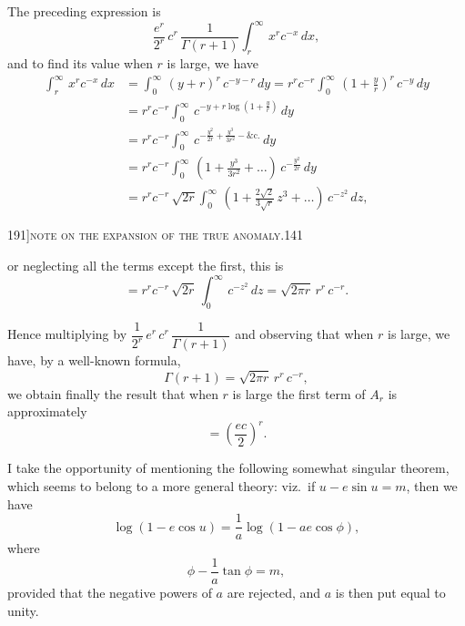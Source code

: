 \documentclass[11pt]{article}
\begin{document}
The preceding expression is
\[
\frac{e^{r}}{2^{r}}\,c^{r}\,\frac{1}{\Gamma(r+1)}\int_{r}^{\infty}\,x^{r} c^{-x}\,dx,
\]
and to find its value when $r$ is large, we have
\begin{align*}
\int_{r}^{\infty}\,x^{r} c^{-x}\,dx &= \int_{0}^{\infty}\,(y + r)^{r}\,c^{-y - r}\,dy = r^{r} c^{-r}\int_{0}^{\infty}\,\left(1 + \tfrac{y}{r}\right)^{r}\,c^{-y}\,dy \\
&= r^{r} c^{-r}\int_{0}^{\infty}\,c^{-y + r\log(1 + \frac{y}{r})}\,dy \\
&= r^{r} c^{-r}\int_{0}^{\infty}\,c^{-\frac{y^{2}}{2r} + \frac{y^{3}}{3r^{2}} - \&\text{c.}}\,dy \\
&= r^{r} c^{-r}\int_{0}^{\infty}\,\left(1 + \frac{y^{3}}{3r^{2}} + \ldots\right)\,c^{-\frac{y^{2}}{2r}}\,dy \\
&= r^{r} c^{-r}\,\sqrt{2 r}\int_{0}^{\infty}\,\left(1 + \frac{2\sqrt{2}}{3\sqrt{r}}\,z^{3} + \ldots\right)\,c^{-z^{2}}\,dz,
\end{align*}

\newpage

\begin{center}
\small 191]\hfill\textsc{note on the expansion of the true anomaly.}\hfill\textsc{141}
\end{center}

\medskip

\noindent or neglecting all the terms except the first, this is
\[
= r^{r} c^{-r}\,\sqrt{2 r}\,\int_{0}^{\infty}\,c^{-z^{2}}\,dz = \sqrt{2 \pi r}\,r^{r}\,c^{-r}.
\]

Hence multiplying by $\dfrac{1}{2^{r}}\,e^{r}\,c^{r}\,\dfrac{1}{\Gamma(r+1)}$ and observing that when $r$ is large, we have, by a well-known formula,
\[
\Gamma(r+1) = \sqrt{2 \pi r}\,r^{r}\,c^{-r},
\]
we obtain finally the result that when $r$ is large the first term of $A_{r}$ is approximately
\[
= \left(\frac{e c}{2}\right)^{r}.
\]

I take the opportunity of mentioning the following somewhat singular theorem, which seems to belong to a more general theory: viz.\ if $u - e\sin u = m$, then we have
\[
\log(1 - e\cos u) = \frac{1}{a}\log(1 - a e\cos\phi),
\]
where
\[
\phi - \frac{1}{a}\tan\phi = m,
\]
provided that the negative powers of $a$ are rejected, and $a$ is then put equal to unity.
\end{document}
